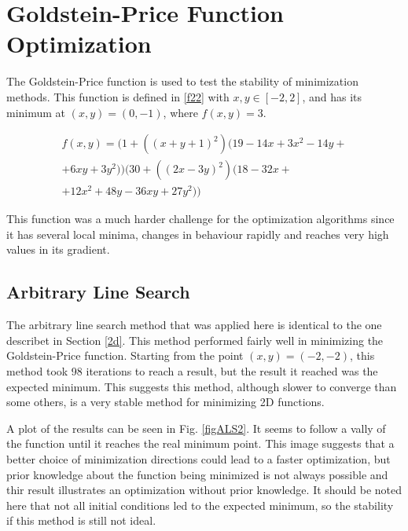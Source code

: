 \documentclass[journal]{IEEEtran}
\begin{document}
\section{Goldstein-Price Function Optimization} \label{2d2}

The Goldstein-Price function is used to test the stability of minimization methods. This function is defined in \ref{f22} with $x,y \in [-2,2]$, and has its minimum at $(x,y) = (0,-1)$, where $f(x,y)= 3$.

\begin{equation}
\begin{split}
f(x,y) = (1+((x+y+1)^2)(19-14x+3x^2-14y+\\
+6xy+3y^2))(30+((2x-3y)^2)(18-32x+\\
+12x^2+48y-36xy+27y^2))
\end{split}
\label{f22}
\end{equation}

This function was a much harder challenge for the optimization algorithms since it has several local minima, changes in behaviour rapidly and reaches very high values in its gradient.

\subsection{Arbitrary Line Search}

The arbitrary line search method that was applied here is identical to the one describet in Section \ref{2d}. This method performed fairly well in minimizing the Goldstein-Price function. Starting from the point $(x,y) = (-2,-2)$, this method took 98 iterations to reach a result, but the result it reached was the expected minimum. This suggests this method, although slower to converge than some others, is a very stable method for minimizing 2D functions.

A plot of the results can be seen in Fig. \ref{figALS2}. It seems to follow a vally of the function until it reaches the real minimum point. This image suggests that a better choice of minimization directions could lead to a faster optimization, but prior knowledge about the function being minimized is not always possible and thir result illustrates an optimization without prior knowledge. It should be noted here that not all initial conditions led to the expected minimum, so the stability if this method is still not ideal.
\end{document}
